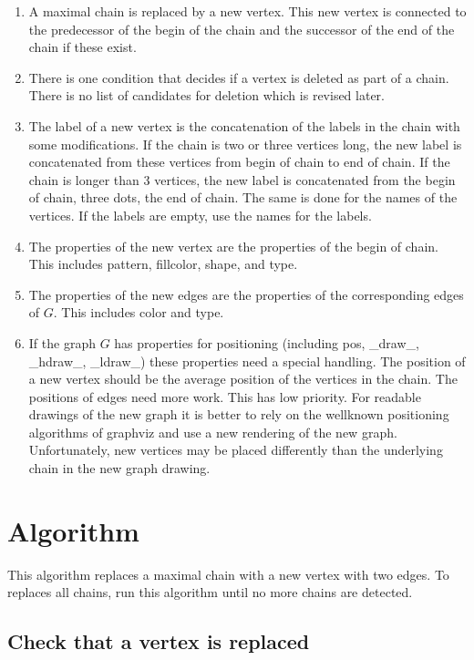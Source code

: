 \documentclass[12pt,a4paper]{report}
\begin{document}
\begin{enumerate}
\item A maximal chain is replaced by a new vertex. This new vertex is connected to the
predecessor of the begin of the chain and the successor of the end of the chain if these exist.

\item There is one condition that decides if a vertex is deleted as part of a chain.
There is no list of candidates for deletion which is revised later.

\item The label of a new vertex is the concatenation of the labels in the chain with some
modifications. If the chain is two or three vertices long, the new label is concatenated
from these vertices from begin of chain to end of chain. If the chain is longer than 3
vertices, the new label is concatenated from the begin of chain, three dots, the end of chain.
The same is done for the names of the vertices. If the labels are empty, use the names for
the labels.

\item The properties of the new vertex are the properties of the begin of chain. This
includes pattern, fillcolor, shape, and type.

\item The properties of the new edges are the properties of the corresponding edges
of $G$. This includes color and type.

\item If the graph $G$ has properties for positioning (including pos, \_draw\_, \_hdraw\_, \_ldraw\_)
these properties need a special handling. The position of a new vertex should be the average
position of the vertices in the chain. The positions of edges need more work. This has low priority.
For readable drawings of the new graph it is better to rely on the wellknown positioning
algorithms of graphviz and use a new rendering of the new graph. Unfortunately, new vertices
may be placed differently than the underlying chain in the new graph drawing.

\end{enumerate}

\chapter{Algorithm}
This algorithm replaces a maximal chain with a new vertex with two edges. To replaces all chains,
run this algorithm until no more chains are detected.
\section{Check that a vertex is replaced}
\end{document}
